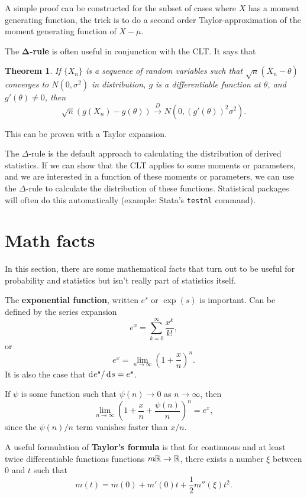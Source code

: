 \documentclass[twoside]{article}
\newtheorem{theorem}{Theorem}%
\begin{document}
A simple proof can be constructed for the subset of cases where $X$ has a moment generating
function, the trick is to do a second order Taylor-approximation of the moment generating
function of $X-\mu$. 

The $\mathbf{\Delta}$\textbf{-rule} is often useful in conjunction with the CLT.
It says that 

\begin{theorem}
If $\{X_n\}$ is a sequence of random variables such that $\sqrt{n}(\overline{X}_n-\theta)$
converges to $N(0,\sigma^2)$ in distribution, $g$ is a differentiable function at $\theta$,
and $g'(\theta)\neq 0$, then 
\[ \sqrt{n}\left(g(X_n) - g(\theta)\right) \xrightarrow{D} 
N\left(0, \left(g'(\theta)\right)^2\sigma^2\right).\]
\end{theorem}
This can be proven with a Taylor expansion. 

The $\Delta$-rule is the default approach to calculating the distribution of derived
statistics. If we can show that the CLT applies to some moments or parameters,
and we are interested in a function of these moments or parameters, we can use the 
$\Delta$-rule to calculate the distribution of these functions. Statistical packages
will often do this automatically (example: Stata's \texttt{testnl} command).

\section{Math facts}
In this section, there are some mathematical facts that turn out to be useful
for probability and statistics but isn't really part of statistics itself.

The \textbf{exponential function}, written $e^s$ or $\exp(s)$ is important. Can be defined by the
series expansion \[ e^x = \sum_{k=0}^\infty \frac{x^k}{k!},\] or
\[ e^x = \lim_{n\rightarrow \infty} \left( 1 + \frac{x}{n} \right)^n. \]
It is also the case that  $\rd e^s / \rd s =e^s$.


If $\psi$ is some function such that $\psi(n) \rightarrow 0$ as $n\rightarrow\infty$,
then \[ \lim_{n\rightarrow\infty} \left(1 + \frac{x}{n} + \frac{\psi(n)}{n}  \right)^n = e^x,\]
since the $\psi(n)/n$ term vanishes faster than $x/n$.

A useful formulation of \textbf{Taylor's formula} is that for continuous and at
least twice differentiable functions functions $m\!\!\!:\!\!\mathbb{R} \rightarrow \mathbb{R}$, there
exists a number $\xi$ between $0$ and $t$ such that \[ m(t) = m(0) + m'(0) t +
\frac{1}{2} m''(\xi) t^2.\]



\end{document}
